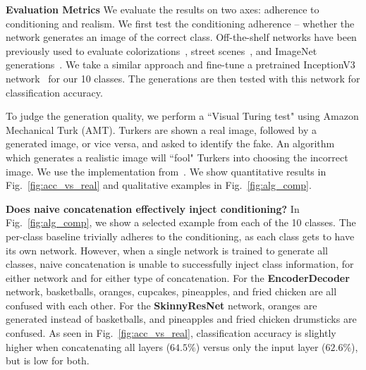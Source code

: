 

\noindent \textbf{Evaluation Metrics} We evaluate the results on two axes: adherence to conditioning and realism. We first test the conditioning adherence -- whether the network generates an image of the correct class. Off-the-shelf networks have been previously used to evaluate colorizations~\cite{zhang2016colorful}, street scenes~\cite{isola2016image2image, wang2017high}, and ImageNet generations~\cite{salimans2016improved}. We take a similar approach and fine-tune a pretrained InceptionV3 network~\cite{szegedy2016rethinking} for our 10 classes. The generations are then tested with this network for classification accuracy.

To judge the generation quality, we perform a ``Visual Turing test" using Amazon Mechanical Turk (AMT). Turkers are shown a real image, followed by a generated image, or vice versa, and asked to identify the fake. An algorithm which generates a realistic image will ``fool" Turkers into choosing the incorrect image. We use the implementation from~\cite{zhang2016colorful}. We show quantitative results in Fig.~\ref{fig:acc_vs_real} and qualitative examples in Fig.~\ref{fig:alg_comp}.

\noindent \textbf{Does naive concatenation effectively inject conditioning?} In Fig.~\ref{fig:alg_comp}, we show a selected example from each of the 10 classes. The per-class baseline trivially adheres to the conditioning, as each class gets to have its own network. However, when a single network is trained to generate all classes, naive concatenation is unable to successfully inject class information, for either network and for either type of concatenation. For the \textbf{EncoderDecoder} network, basketballs, oranges, cupcakes, pineapples, and fried chicken are all confused with each other. For the \textbf{SkinnyResNet} network, oranges are generated instead of basketballs, and pineapples and fried chicken drumsticks are confused. As seen in Fig.~\ref{fig:acc_vs_real}, classification accuracy is slightly higher when concatenating all layers ($64.5\%$) versus only the input layer ($62.6\%$), but is low for both.

